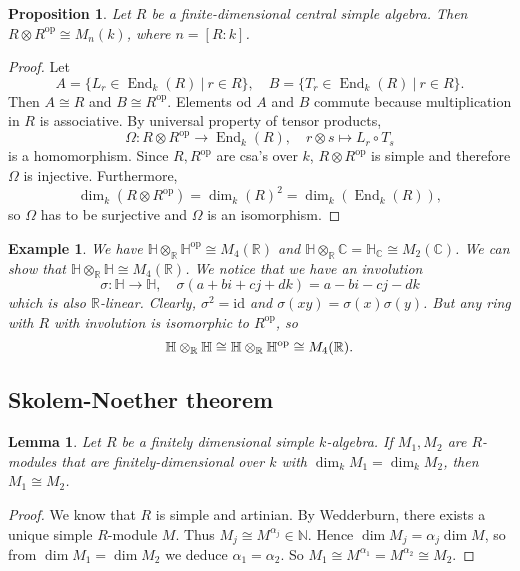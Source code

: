 \documentclass[10pt, a4paper]{article}
\newtheorem{proposition}[thm]{Proposition}
\newtheorem{example}[thm]{Example}
\newtheorem{lemma}[thm]{Lemma}
\newenvironment{noticeC}{%
  \tcolorbox[%
  notitle,
  empty,
  enhanced,  %
  breakable,
  coltext=black, 
  fontupper=\rmfamily,
  noparskip,
  sharp corners,
  boxrule=-1pt,  %
  frame hidden,
  left=7pt,  %
  right=7pt,
  top=5pt,
  bottom=5pt,
  before skip=2.5ex plus 2pt,
  after skip=2.5ex plus 2pt,
  overlay unbroken and last={%
  },
  ]}
{\endtcolorbox}
\newenvironment{myproof}%
  {\begin{noticeC}\begin{proof}}%
  {\end{proof}\end{noticeC}}
\newcommand{\N}{\mathbb {N}}
\newcommand{\R}{\mathbb {R}}
\newcommand{\C}{\mathbb {C}}
\newcommand{\Ha}{\mathbb {H}}
\DeclareMathOperator{\op}{op}
\DeclareMathOperator{\en}{End}
\begin{document}
\begin{proposition}
  Let $R$ be a finite-dimensional central simple algebra. 
  Then $R \otimes R^{\op} \cong M_n (k)$, where $n = [R:k]$.
\end{proposition}

\begin{myproof}
  Let $$A = \{L_r \in \en_k (R)\ |\ r \in R\},\quad B = \{T_r \in \en_k (R)\ |\ r \in R\}.$$
  Then $A \cong R$ and $B \cong R^{\op}$. Elements od $A$ and $B$ commute because multiplication 
  in $R$ is associative. By universal property of tensor products,
  $$\Omega: R \otimes R^{\op} \to \en_k (R),\quad r \otimes s \mapsto L_r \circ T_s$$
  is a homomorphism. Since $R, R^{\op}$ are csa's over $k$, $R \otimes R^{\op}$ is simple and therefore $\Omega$ is injective.
  Furthermore, 
  $$\dim_k (R \otimes R^{\op}) = \dim_k (R) ^2 = \dim_k (\en_k (R)),$$
  so $\Omega$ has to be surjective and $\Omega$ is an isomorphism. 
\end{myproof}

\begin{example}
  We have $\Ha \otimes_{\R} \Ha^{\op} \cong M_4 (\R)$ and $\Ha \otimes_{\R} \C = \Ha_{\C} \cong M_2 (\C)$.
  We can show that $\Ha \otimes_{\R} \Ha \cong M_4 (\R)$. We notice that we have an involution 
  $$\sigma: \Ha \to \Ha,\quad \sigma (a + bi + cj + dk) = a -bi - cj - dk$$
  which is also $\R$-linear. Clearly, $\sigma^2 = \mathrm{id}$ and $\sigma(xy) = \sigma(x) \sigma(y)$.
  But any ring with $R$ with involution is isomorphic to $R^{\op}$, so 
  \begin{equation*}
    \Ha \otimes_{\R} \Ha \cong \Ha \otimes_{\R} \Ha^{\op} \cong M_4 (\R). \qedhere
  \end{equation*}
\end{example}

\subsection{Skolem-Noether theorem}

\begin{lemma}
  Let $R$ be a finitely dimensional simple $k$-algebra. If $M_1, M_2$ are $R$-modules
  that are finitely-dimensional over $k$ with $\dim_k M_1 = \dim_k M_2$, then $M_1 \cong M_2$.
\end{lemma}

\begin{myproof}
  We know that $R$ is simple and artinian. By Wedderburn, there exists a unique simple $R$-module $M$.
  Thus $M_j \cong M^{\alpha_j} \in \N$. Hence $\dim M_j = \alpha_j \dim M$,
  so from $\dim M_1 = \dim M_2$ we deduce $\alpha_1 = \alpha_2$. So $M_1 \cong M^{\alpha_1} = M^{\alpha_2} \cong M_2$.
\end{myproof}
\end{document}

